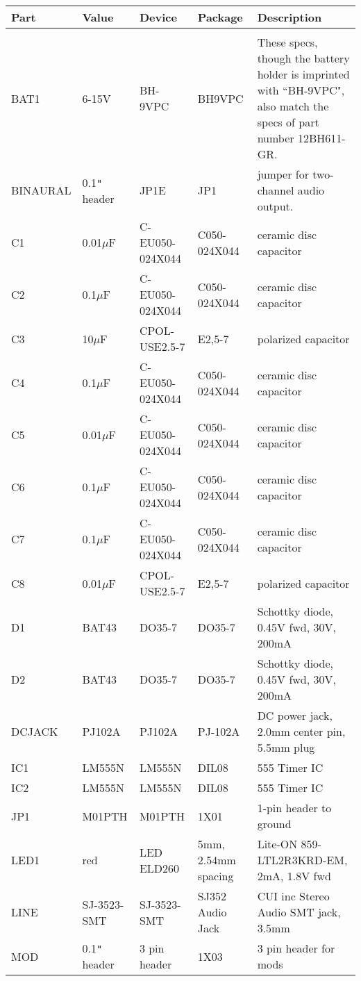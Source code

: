 \begin{footnotesize}
\begin{tabular}{l p{1in} p{1.6in}  p{1.7in}  p{3.0in} }

\large{\textbf{Part}} &  \large{\textbf{Value}} &  \large{\textbf{Device}} &  \large{\textbf{Package}} &  \large{\textbf{Description}} \\[\sep]
\hline\\[\negsep]
BAT1 & 6-15V & BH-9VPC & BH9VPC & These specs, though the battery holder is imprinted with ``BH-9VPC", also match the specs of part number 12BH611-GR. \\
BINAURAL & 0.1\texttt{"} header & JP1E & JP1 & jumper for two-channel audio output. \\
C1  & 0.01$\mu$F & C-EU050-024X044 & C050-024X044 & ceramic disc capacitor  \\
C2  & 0.1$\mu$F & C-EU050-024X044 & C050-024X044 & ceramic disc capacitor   \\
C3  & 10$\mu$F & CPOL-USE2.5-7 & E2,5-7 & polarized capacitor  \\
C4  & 0.1$\mu$F & C-EU050-024X044 & C050-024X044 & ceramic disc capacitor   \\
C5  & 0.01$\mu$F & C-EU050-024X044 & C050-024X044 & ceramic disc capacitor   \\
C6  & 0.1$\mu$F & C-EU050-024X044 & C050-024X044 & ceramic disc capacitor   \\
C7  & 0.1$\mu$F & C-EU050-024X044 & C050-024X044 & ceramic disc capacitor   \\
C8  & 0.01$\mu$F & CPOL-USE2.5-7 & E2,5-7 & polarized capacitor  \\
D1  & BAT43 & DO35-7 & DO35-7 & Schottky diode, 0.45V fwd, 30V, 200mA \\
D2  & BAT43 & DO35-7 & DO35-7 & Schottky diode, 0.45V fwd, 30V, 200mA \\
DCJACK & PJ102A & PJ102A & PJ-102A & DC power jack, 2.0mm center pin, 5.5mm plug \\
IC1 & LM555N & LM555N & DIL08 & 555 Timer IC \\
IC2 & LM555N & LM555N & DIL08 & 555 Timer IC \\
JP1 & M01PTH & M01PTH & 1X01 & 1-pin header to ground \\
LED1 & red & LED ELD260 & 5mm, 2.54mm spacing & Lite-ON 859-LTL2R3KRD-EM, 2mA, 1.8V fwd  \\
LINE & SJ-3523-SMT & SJ-3523-SMT & SJ352 Audio Jack & CUI inc Stereo Audio SMT jack, 3.5mm \\
MOD & 0.1\texttt{"} header & 3 pin header & 1X03 & 3 pin header for mods \\

\end{tabular}
\end{footnotesize}
